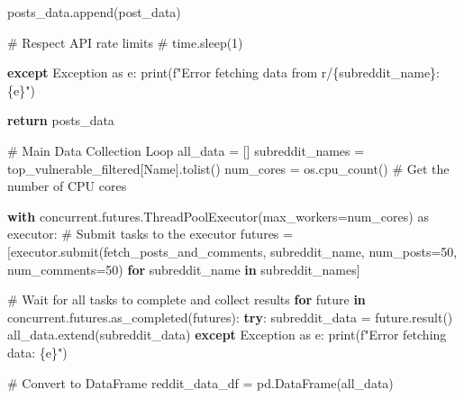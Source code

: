 \documentclass[
  12pt,
  letterpaper,
  DIV=11,
  numbers=noendperiod]{scrartcl}
\newenvironment{Shaded}{\begin{snugshade}}{\end{snugshade}}
\newcommand{\BuiltInTok}[1]{\textcolor[rgb]{0.00,0.23,0.31}{#1}}
\newcommand{\CommentTok}[1]{\textcolor[rgb]{0.37,0.37,0.37}{#1}}
\newcommand{\ControlFlowTok}[1]{\textcolor[rgb]{0.00,0.23,0.31}{\textbf{#1}}}
\newcommand{\DecValTok}[1]{\textcolor[rgb]{0.68,0.00,0.00}{#1}}
\newcommand{\ImportTok}[1]{\textcolor[rgb]{0.00,0.46,0.62}{#1}}
\newcommand{\KeywordTok}[1]{\textcolor[rgb]{0.00,0.23,0.31}{\textbf{#1}}}
\newcommand{\NormalTok}[1]{\textcolor[rgb]{0.00,0.23,0.31}{#1}}
\newcommand{\OperatorTok}[1]{\textcolor[rgb]{0.37,0.37,0.37}{#1}}
\newcommand{\PreprocessorTok}[1]{\textcolor[rgb]{0.68,0.00,0.00}{#1}}
\newcommand{\SpecialCharTok}[1]{\textcolor[rgb]{0.37,0.37,0.37}{#1}}
\newcommand{\SpecialStringTok}[1]{\textcolor[rgb]{0.13,0.47,0.30}{#1}}
\newcommand{\StringTok}[1]{\textcolor[rgb]{0.13,0.47,0.30}{#1}}
\begin{document}
\begin{Shaded}
\begin{Highlighting}[]
\NormalTok{            posts\_data.append(post\_data)}

            \CommentTok{\# Respect API rate limits}
            \CommentTok{\# time.sleep(1)}

    \ControlFlowTok{except} \PreprocessorTok{Exception} \ImportTok{as}\NormalTok{ e:}
        \BuiltInTok{print}\NormalTok{(}\SpecialStringTok{f"Error fetching data from r/}\SpecialCharTok{\{}\NormalTok{subreddit\_name}\SpecialCharTok{\}}\SpecialStringTok{: }\SpecialCharTok{\{}\NormalTok{e}\SpecialCharTok{\}}\SpecialStringTok{"}\NormalTok{)}

    \ControlFlowTok{return}\NormalTok{ posts\_data}

\CommentTok{\# Main Data Collection Loop}
\NormalTok{all\_data }\OperatorTok{=}\NormalTok{ []}
\NormalTok{subreddit\_names }\OperatorTok{=}\NormalTok{ top\_vulnerable\_filtered[}\StringTok{\textquotesingle{}Name\textquotesingle{}}\NormalTok{].tolist()}
\NormalTok{num\_cores }\OperatorTok{=}\NormalTok{ os.cpu\_count()  }\CommentTok{\# Get the number of CPU cores}

\ControlFlowTok{with}\NormalTok{ concurrent.futures.ThreadPoolExecutor(max\_workers}\OperatorTok{=}\NormalTok{num\_cores) }\ImportTok{as}\NormalTok{ executor:}
    \CommentTok{\# Submit tasks to the executor}
\NormalTok{    futures }\OperatorTok{=}\NormalTok{ [executor.submit(fetch\_posts\_and\_comments, subreddit\_name, num\_posts}\OperatorTok{=}\DecValTok{50}\NormalTok{, num\_comments}\OperatorTok{=}\DecValTok{50}\NormalTok{) }\ControlFlowTok{for}\NormalTok{ subreddit\_name }\KeywordTok{in}\NormalTok{ subreddit\_names]}

    \CommentTok{\# Wait for all tasks to complete and collect results}
    \ControlFlowTok{for}\NormalTok{ future }\KeywordTok{in}\NormalTok{ concurrent.futures.as\_completed(futures):}
        \ControlFlowTok{try}\NormalTok{:}
\NormalTok{            subreddit\_data }\OperatorTok{=}\NormalTok{ future.result()}
\NormalTok{            all\_data.extend(subreddit\_data)}
        \ControlFlowTok{except} \PreprocessorTok{Exception} \ImportTok{as}\NormalTok{ e:}
            \BuiltInTok{print}\NormalTok{(}\SpecialStringTok{f"Error fetching data: }\SpecialCharTok{\{}\NormalTok{e}\SpecialCharTok{\}}\SpecialStringTok{"}\NormalTok{)}

\CommentTok{\# Convert to DataFrame}
\NormalTok{reddit\_data\_df }\OperatorTok{=}\NormalTok{ pd.DataFrame(all\_data)}


\end{Highlighting}
\end{Shaded}
\end{document}
